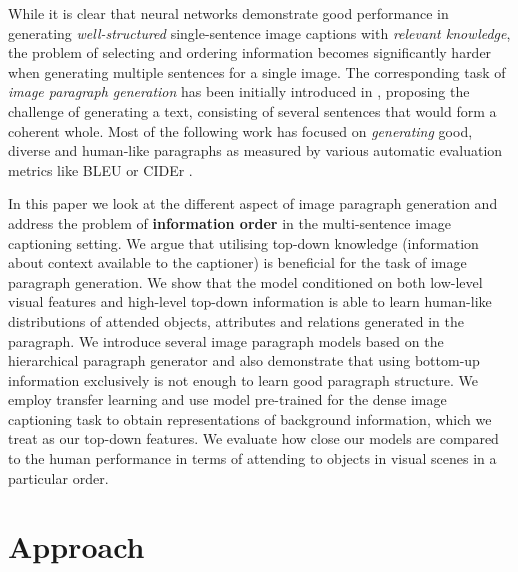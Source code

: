 \documentclass[11pt,a4paper]{article}
\begin{document}
While it is clear that neural networks demonstrate good performance in generating \textit{well-structured} single-sentence image captions with \textit{relevant knowledge}, the problem of selecting and ordering information becomes significantly harder when generating multiple sentences for a single image. The corresponding task of
\textit{image paragraph generation} has been initially introduced in , proposing the challenge of generating a text, consisting of several sentences that would form a coherent whole.
Most of the following work \cite{liang2017recurrent,chatterjee2018diverse,wang2019convolutional} has focused on \textit{generating} good, diverse and human-like paragraphs as measured by various automatic evaluation metrics like BLEU \cite{bleu} or CIDEr \cite{vedantam2014cider}.

In this paper we look at the different aspect of image paragraph generation and address the problem of \textbf{information order} in the multi-sentence image captioning setting.
We argue that utilising top-down knowledge (information about context available to the captioner) is beneficial for the task of image paragraph generation.
We show that the model conditioned on both low-level visual features and high-level top-down information is able to learn human-like distributions of attended objects, attributes and relations generated in the paragraph.
We introduce several image paragraph models based on the hierarchical paragraph generator  and also
demonstrate that using bottom-up information exclusively is not enough to learn good paragraph structure.
We employ transfer learning and use model pre-trained for the dense image captioning task \cite{densecap} to obtain representations of background information, which we treat as our top-down features.
We evaluate how close our models are compared to the human performance in terms of attending to objects in visual scenes in a particular order.

\fi






\section{Approach}
\end{document}
